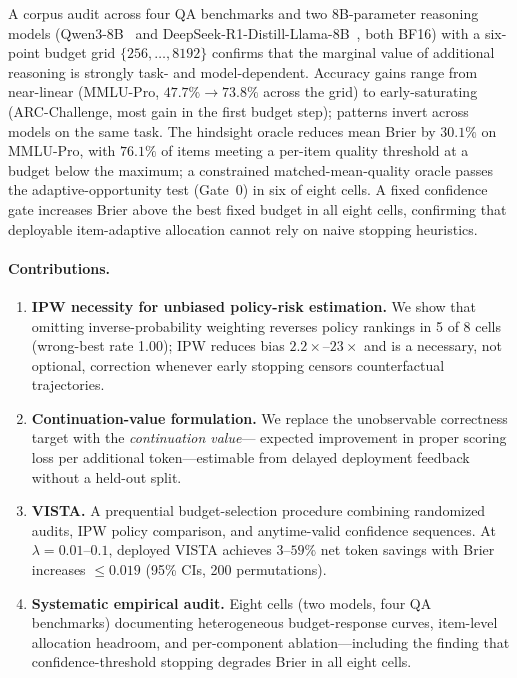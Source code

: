 \documentclass[a4paper,fleqn]{cas-sc}
\theoremstyle{plain}
\theoremstyle{definition}
\theoremstyle{remark}
\begin{document}
A corpus audit across four QA benchmarks and two 8B-parameter reasoning models
(Qwen3-8B~\cite{qwen3} and DeepSeek-R1-Distill-Llama-8B~\cite{deepseekr1}, both BF16) with a six-point
budget grid $\{256,\ldots,8192\}$ confirms that the marginal value of additional
reasoning is strongly task- and model-dependent.
Accuracy gains range from near-linear (MMLU-Pro, $47.7\%\to73.8\%$ across the
grid) to early-saturating (ARC-Challenge, most gain in the first budget step);
patterns invert across models on the same task.
The hindsight oracle reduces mean Brier by $30.1\%$ on MMLU-Pro, with
$76.1\%$ of items meeting a per-item quality threshold at a budget below the
maximum; a constrained matched-mean-quality oracle passes the adaptive-opportunity
test (Gate~0) in six of eight cells.
A fixed confidence gate increases Brier above the best fixed budget in all
eight cells, confirming that deployable item-adaptive allocation cannot rely
on naive stopping heuristics.

\paragraph{Contributions.}
\begin{enumerate}
\item \textbf{IPW necessity for unbiased policy-risk estimation.}
We show that omitting inverse-probability weighting reverses policy rankings
in 5 of 8 cells (wrong-best rate 1.00); IPW reduces bias $2.2\times$--$23\times$
and is a necessary, not optional, correction whenever early stopping censors
counterfactual trajectories.
\item \textbf{Continuation-value formulation.}
We replace the unobservable correctness target with the \emph{continuation value}---
expected improvement in proper scoring loss per additional token---estimable
from delayed deployment feedback without a held-out split.
\item \textbf{VISTA.}
A prequential budget-selection procedure combining randomized audits,
IPW policy comparison, and anytime-valid confidence sequences.
At $\lambda{=}0.01$--$0.1$, deployed VISTA achieves $3$--$59\%$ net token
savings with Brier increases ${\leq}0.019$ (95\% CIs, 200 permutations).
\item \textbf{Systematic empirical audit.}
Eight cells (two models, four QA benchmarks) documenting heterogeneous
budget-response curves, item-level allocation headroom, and per-component
ablation---including the finding that confidence-threshold stopping degrades
Brier in all eight cells.
\end{enumerate}
\end{document}
